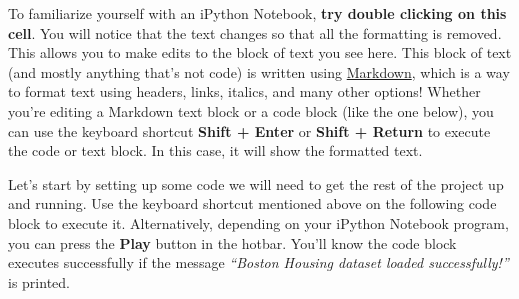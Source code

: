 \documentclass{article}
\begin{document}
To familiarize yourself with an iPython Notebook, \textbf{try double
clicking on this cell}. You will notice that the text changes so that
all the formatting is removed. This allows you to make edits to the
block of text you see here. This block of text (and mostly anything
that's not code) is written using
\href{http://daringfireball.net/projects/markdown/syntax}{Markdown},
which is a way to format text using headers, links, italics, and many
other options! Whether you're editing a Markdown text block or a code
block (like the one below), you can use the keyboard shortcut
\textbf{Shift + Enter} or \textbf{Shift + Return} to execute the code or
text block. In this case, it will show the formatted text.

Let's start by setting up some code we will need to get the rest of the
project up and running. Use the keyboard shortcut mentioned above on the
following code block to execute it. Alternatively, depending on your
iPython Notebook program, you can press the \textbf{Play} button in the
hotbar. You'll know the code block executes successfully if the message
\emph{``Boston Housing dataset loaded successfully!''} is printed.
\end{document}
